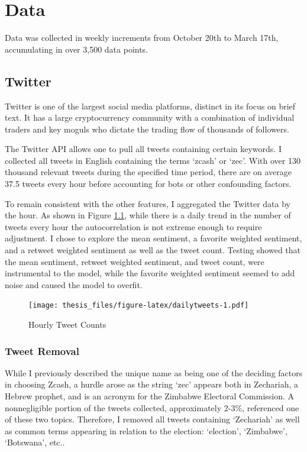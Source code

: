 \documentclass[12pt,twoside]{dukestatscithesis}
\begin{document}
\chapter{Data}\label{data}

Data was collected in weekly increments from October 20th to March 17th,
accumulating in over 3,500 data points.

\section{Twitter}\label{twitter}

Twitter is one of the largest social media platforms, distinct in its
focus on brief text. It has a large cryptocurrency community with a
combination of individual traders and key moguls who dictate the trading
flow of thousands of followers.

The Twitter API allows one to pull all tweets containing certain
keywords. I collected all tweets in English containing the terms `zcash'
or `zec'. With over 130 thousand relevant tweets during the specified
time period, there are on average 37.5 tweets every hour before
accounting for bots or other confounding factors.

To remain consistent with the other features, I aggregated the Twitter
data by the hour. As shown in Figure \ref{fig:dailytweets}, while there
is a daily trend in the number of tweets every hour the autocorrelation
is not extreme enough to require adjustment. I chose to explore the mean
sentiment, a favorite weighted sentiment, and a retweet weighted
sentiment as well as the tweet count. Testing showed that the mean
sentiment, retweet weighted sentiment, and tweet count, were
instrumental to the model, while the favorite weighted sentiment seemed
to add noise and caused the model to overfit.
\begin{figure}
\centering
\texttt{[image: thesis\_files/figure-latex/dailytweets-1.pdf]}
\caption{\label{fig:dailytweets}Hourly Tweet Counts}
\end{figure}
\subsection{Tweet Removal}\label{tweet-removal}

While I previously described the unique name as being one of the
deciding factors in choosing Zcash, a hurdle arose as the string `zec'
appears both in Zechariah, a Hebrew prophet, and is an acronym for the
Zimbabwe Electoral Commission. A nonnegligible portion of the tweets
collected, approximately 2-3\%, referenced one of these two topics.
Therefore, I removed all tweets containing `Zechariah' as well as common
terms appearing in relation to the election: `election', `Zimbabwe',
`Botswana', etc..
\end{document}
